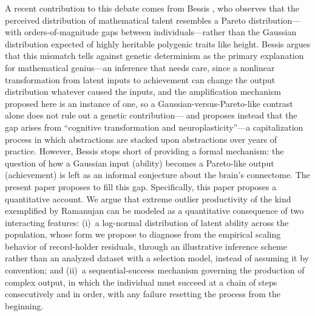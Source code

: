 \documentclass{article}
\begin{document}
A recent contribution to this debate comes from Bessis \cite{bessis2024mathematica,bessis2025genes,bessis2026jaimungal}, who observes that the perceived distribution of mathematical talent resembles a Pareto distribution---with orders-of-magnitude gaps between individuals---rather than the Gaussian distribution expected of highly heritable polygenic traits like height. Bessis argues that this mismatch tells against genetic determinism as the primary explanation for mathematical genius---an inference that needs care, since a nonlinear transformation from latent inputs to achievement can change the output distribution whatever caused the inputs, and the amplification mechanism proposed here is an instance of one, so a Gaussian-versus-Pareto-like contrast alone does not rule out a genetic contribution--- and proposes instead that the gap arises from ``cognitive transformation and neuroplasticity''---a capitalization process in which abstractions are stacked upon abstractions over years of practice. However, Bessis stops short of providing a formal mechanism: the question of {how} a Gaussian input (ability) becomes a Pareto-like output (achievement) is left as an informal conjecture about the brain's connectome. The present paper proposes to fill this gap.
Specifically, this paper proposes a quantitative account. We argue that extreme outlier productivity of the kind exemplified by Ramanujan can be modeled as a {quantitative consequence} of two interacting features: (i)~a log-normal
distribution of latent ability across the population, whose form we propose to diagnose from the empirical scaling behavior of record-holder residuals, through an illustrative inference scheme rather than an analyzed dataset with a selection model, instead of assuming it by convention; and (ii)~a sequential-success
mechanism governing the production of complex output, in which the
individual must succeed at a chain of steps consecutively and in order,
with any failure resetting the process from the beginning.
\end{document}
